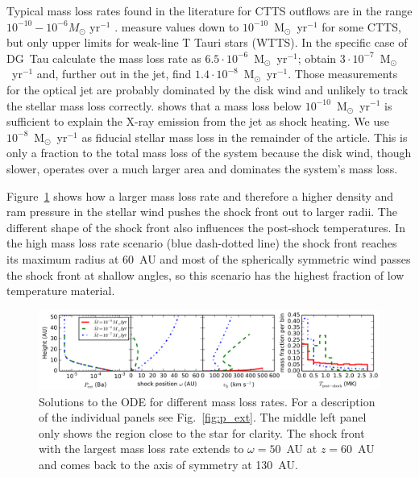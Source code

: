 \documentclass{emulateapj}
\begin{document}
Typical mass loss rates found in the literature for CTTS outflows are in the range $10^{-10}-10^{-6}M_{\odot}\textrm{ yr}^{-1}$ \citep{1999A&A...342..717B,2006A&A...456..189P}. \citet{2006ApJ...646..319E} measure values down to $10^{-10}$~M$_{\odot}$~yr$^{-1}$ for some CTTS, but only upper limits for weak-line T Tauri stars (WTTS). In the specific case of DG~Tau \citet{1997A&A...327..671L} calculate the  mass loss rate as $6.5\cdot 10^{-6}$~M$_{\odot}$~yr$^{-1}$; \citet{1995ApJ...452..736H}
obtain $3\cdot 10^{-7}$~M$_{\odot}$~yr$^{-1}$ and, further out in the jet, \citet{2000A&A...356L..41L} find $1.4\cdot 10^{-8}$~M$_{\odot}$~yr$^{-1}$. Those measurements for the optical jet are probably dominated by the disk wind \citep[e.g.][]{2014arXiv1404.0728W} and unlikely to track the stellar mass loss correctly.
\citet{2009A&A...493..579G} shows that a mass loss below $10^{-10}$~M$_{\odot}$~yr$^{-1}$ is sufficient to explain the X-ray emission from the jet as shock heating.
We use $10^{-8}$~M$_{\odot}$~yr$^{-1}$ as fiducial stellar mass loss in the remainder of the article. This is only a fraction to the total mass loss of the system because the disk wind, though slower, operates over a much larger area and dominates the system's mass loss.

Figure~\ref{fig:dot_m} shows how a larger mass loss rate and therefore a higher density and ram pressure in the stellar wind pushes the shock front out to larger radii. The different shape of the shock front also influences the post-shock temperatures. In the high mass loss rate scenario (blue dash-dotted line) the shock front reaches its maximum radius at 60~AU and most of the spherically symmetric wind passes the shock front at shallow angles, so this scenario has the highest fraction of low temperature material.


\begin{figure}[h!]
\begin{center}
\includegraphics[width=1\columnwidth]{figures/dot_m/dot_m.png}
\caption{\label{fig:dot_m}
Solutions to the ODE for different mass loss rates. For a description of the individual panels see Fig.~\ref{fig:p_ext}. The middle left panel only shows the region close to the star for clarity. The shock front with the largest mass loss rate extends to $\omega=50$~AU at $z=60$~AU and comes back to the axis of symmetry at 130~AU.}
\end{center}
\end{figure}
\end{document}
